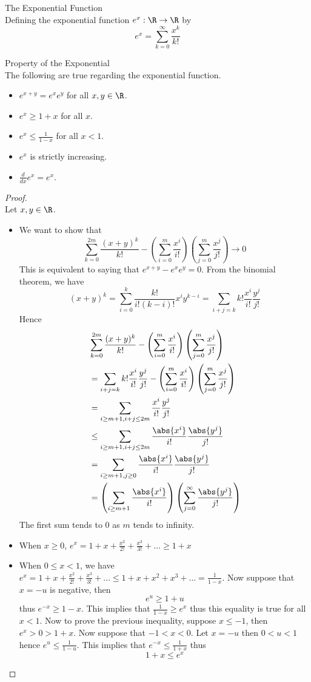 \documentclass[a4paper]{article}
\begin{document}
\begin{defn}{The Exponential Function}{}\\
Defining the exponential function $e^x:\R\to\R$ by $$e^x=\sum_{k=0}^\infty\frac{x^k}{k!}$$
\end{defn}

\begin{prp}{Property of the Exponential}{}\\
The following are true regarding the exponential function. 
\begin{itemize}
\item $e^{x+y}=e^xe^y$ for all $x,y\in\R$. 
\item $e^x\geq 1+x$ for all $x$. 
\item $e^x\leq\frac{1}{1-x}$ for all $x<1$. 
\item $e^x$ is strictly increasing. 
\item $\frac{d}{dx}e^x=e^x$. 
\end{itemize}
\begin{proof}\\ Let $x,y\in\R$. 
\begin{itemize}
\item We want to show that $$\sum_{k=0}^{2m}\frac{(x+y)^k}{k!}-\left(\sum_{i=0}^m\frac{x^i}{i!}\right)\left(\sum_{j=0}^m\frac{x^j}{j!}\right)\to0$$ This is equivalent to saying that $e^{x+y}-e^xe^y=0$. From the binomial theorem, we have $$(x+y)^k=\sum_{i=0}^k\frac{k!}{i!(k-i)!}x^iy^{k-i}=\sum_{i+j=k}k!\frac{x^i}{i!}\frac{y^j}{j!}$$ Hence
\begin{align*}
&\sum_{k=0}^{2m}\frac{(x+y)^k}{k!}-\left(\sum_{i=0}^m\frac{x^i}{i!}\right)\left(\sum_{j=0}^m\frac{x^j}{j!}\right)\\
&=\sum_{i+j=k}k!\frac{x^i}{i!}\frac{y^j}{j!}-\left(\sum_{i=0}^m\frac{x^i}{i!}\right)\left(\sum_{j=0}^m\frac{x^j}{j!}\right)\\
&=\sum_{i\geq m+1,i+j\leq 2m}\frac{x^i}{i!}\frac{y^j}{j!}\\
&\leq\sum_{i\geq m+1,i+j\leq 2m}\frac{\abs{x^i}}{i!}\frac{\abs{y^j}}{j!}\\
&=\sum_{i\geq m+1,j\geq0}\frac{\abs{x^i}}{i!}\frac{\abs{y^j}}{j!}\\
&=\left(\sum_{i\geq m+1}\frac{\abs{x^i}}{i!}\right)\left(\sum_{j=0}^\infty\frac{\abs{y^j}}{j!}\right)
\end{align*} The first sum tends to $0$ as $m$ tends to infinity. 
\item When $x\geq0$, $e^x=1+x+\frac{x^2}{2!}+\frac{x^3}{3!}+\dots\geq 1+x$
\item When $0\leq x<1$, we have $e^x=1+x+\frac{x^2}{2!}+\frac{x^3}{3!}+\dots\leq1+x+x^2+x^3+\dots=\frac{1}{1-x}$. Now suppose that $x=-u$ is negative, then $$e^u\geq1+u$$ thus $e^{-x}\geq1-x$. This implies that $\frac{1}{1-x}\geq e^x$ thus this equality is true for all $x<1$. Now to prove the previous inequality, suppose $x\leq-1$, then $e^x>0>1+x$. Now suppose that $-1<x<0$. Let $x=-u$ then $0<u<1$ hence $e^u\leq\frac{1}{1-u}$. This implies that $e^{-x}\leq\frac{1}{1+x}$ thus $$1+x\leq e^x$$

\end{itemize}
\end{proof}
\end{prp}
\end{document}
